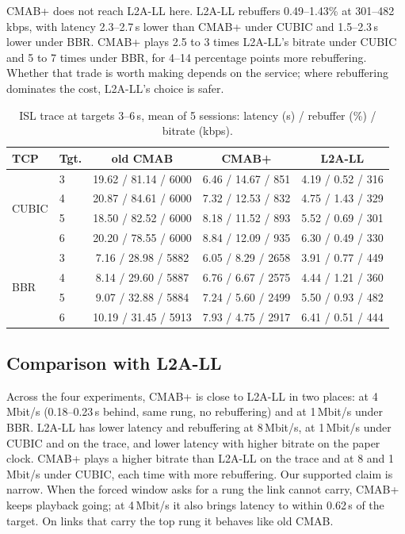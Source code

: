 \documentclass[sigconf]{acmart}
\newcommand{\cmabp}{CMAB+\xspace}
\newcommand{\oldcmab}{old CMAB\xspace}
\newcommand{\kbps}{\,kbps\xspace}
\begin{document}
\cmabp does not reach L2A-LL here. L2A-LL rebuffers 0.49--1.43\% at 301--482\kbps, with latency 2.3--2.7\,s lower than \cmabp under CUBIC and 1.5--2.3\,s lower under BBR. \cmabp plays 2.5 to 3 times L2A-LL's bitrate under CUBIC and 5 to 7 times under BBR, for 4--14 percentage points more rebuffering. Whether that trade is worth making depends on the service; where rebuffering dominates the cost, L2A-LL's choice is safer.


\begin{table}[t]
\caption{ISL trace at targets 3--6\,s, mean of 5 sessions: latency (s) / rebuffer (\%) / bitrate (kbps).}
\label{tab:trace}
\footnotesize
\setlength{\tabcolsep}{2.6pt}
\begin{tabular}{@{}llccc@{}}
\toprule
TCP & Tgt. & old CMAB & CMAB+ & L2A-LL \\
\midrule
\multirow{4}{*}{CUBIC} & 3 & 19.62 / 81.14 / 6000 & 6.46 / 14.67 / 851 & 4.19 / 0.52 / 316 \\
 & 4 & 20.87 / 84.61 / 6000 & 7.32 / 12.53 / 832 & 4.75 / 1.43 / 329 \\
 & 5 & 18.50 / 82.52 / 6000 & 8.18 / 11.52 / 893 & 5.52 / 0.69 / 301 \\
 & 6 & 20.20 / 78.55 / 6000 & 8.84 / 12.09 / 935 & 6.30 / 0.49 / 330 \\
\midrule
\multirow{4}{*}{BBR} & 3 & 7.16 / 28.98 / 5882 & 6.05 / 8.29 / 2658 & 3.91 / 0.77 / 449 \\
 & 4 & 8.14 / 29.60 / 5887 & 6.76 / 6.67 / 2575 & 4.44 / 1.21 / 360 \\
 & 5 & 9.07 / 32.88 / 5884 & 7.24 / 5.60 / 2499 & 5.50 / 0.93 / 482 \\
 & 6 & 10.19 / 31.45 / 5913 & 7.93 / 4.75 / 2917 & 6.41 / 0.51 / 444 \\
\bottomrule
\end{tabular}
\end{table}

\subsection{Comparison with L2A-LL}
\label{sec:l2a}

Across the four experiments, \cmabp is close to L2A-LL in two places: at 4\,Mbit/s (0.18--0.23\,s behind, same rung, no rebuffering) and at 1\,Mbit/s under BBR. L2A-LL has lower latency and rebuffering at 8\,Mbit/s, at 1\,Mbit/s under CUBIC and on the trace, and lower latency with higher bitrate on the paper clock. \cmabp plays a higher bitrate than L2A-LL on the trace and at 8 and 1\,Mbit/s under CUBIC, each time with more rebuffering. Our supported claim is narrow. When the forced window asks for a rung the link cannot carry, \cmabp keeps playback going; at 4\,Mbit/s it also brings latency to within 0.62\,s of the target. On links that carry the top rung it behaves like \oldcmab.
\end{document}

